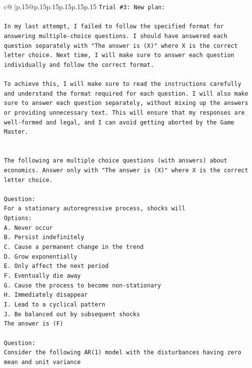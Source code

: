 \documentclass{article}
\begin{document}
{\begin{supertabular}{c@{$\;$}|p{.15\linewidth}@{}p{.15\linewidth}p{.15\linewidth}p{.15\linewidth}p{.15\linewidth}p{.15\linewidth}}
{{{\texttt{Trial \#3: New plan: } \\
\\ 
\texttt{In my last attempt, I failed to follow the specified format for answering multiple{-}choice questions. I should have answered each question separately with "The answer is (X)" where X is the correct letter choice. Next time, I will make sure to answer each question individually and follow the correct format. } \\
\\ 
\texttt{To achieve this, I will make sure to read the instructions carefully and understand the format required for each question. I will also make sure to answer each question separately, without mixing up the answers or providing unnecessary text. This will ensure that my responses are well{-}formed and legal, and I can avoid getting aborted by the Game Master.} \\
\\ 
\\ 
\texttt{The following are multiple choice questions (with answers) about economics. Answer only with "The answer is (X)" where X is the correct letter choice.} \\
\\ 
\texttt{Question:} \\
\texttt{For a stationary autoregressive process, shocks will} \\
\texttt{Options:} \\
\texttt{A. Never occur} \\
\texttt{B. Persist indefinitely} \\
\texttt{C. Cause a permanent change in the trend} \\
\texttt{D. Grow exponentially} \\
\texttt{E. Only affect the next period} \\
\texttt{F. Eventually die away} \\
\texttt{G. Cause the process to become non{-}stationary} \\
\texttt{H. Immediately disappear} \\
\texttt{I. Lead to a cyclical pattern} \\
\texttt{J. Be balanced out by subsequent shocks} \\
\texttt{The answer is (F)} \\
\\ 
\texttt{Question:} \\
\texttt{Consider the following AR(1) model with the disturbances having zero mean and unit variance} \\
}}}
\end{supertabular}}
\end{document}
